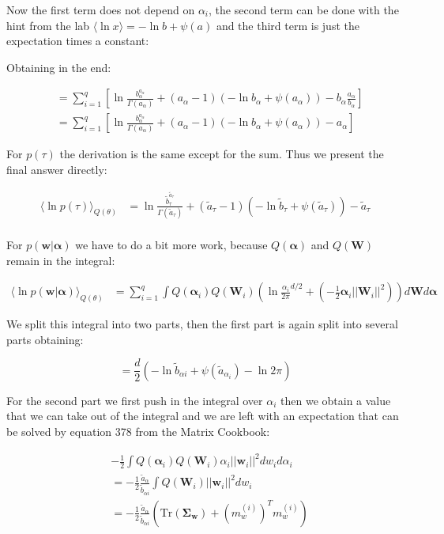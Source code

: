 \documentclass{article}
\def\*#1{\boldsymbol{#1}}
\begin{document}
Now the first term does not depend on $\alpha_i$, the second term can be done with the hint from the lab $\langle \ln x\rangle = - \ln b + \psi(a)$ and the third term is just the expectation times a constant:

Obtaining in the end:

\begin{align*}
&= \sum_{i=1}^q \left [ \ln \frac{b_\alpha^{a_\alpha}}{\Gamma(a_\alpha)} + (a_\alpha - 1)(- \ln b_\alpha + \psi(a_\alpha)) - b_\alpha \frac{a_\alpha}{b_\alpha} \right] \\
&= \sum_{i=1}^q \left [\ln \frac{b_\alpha^{a_\alpha}}{\Gamma(a_\alpha)} + (a_\alpha - 1)(- \ln b_\alpha + \psi(a_\alpha)) - a_\alpha \right ]
\end{align*}

For $p(\tau)$ the derivation is the same except for the sum. Thus we present the final answer directly:

\begin{align*}
\langle \ln p(\tau) \rangle_{Q(\theta)} &= \ln \frac{\tilde{b}_\tau^{\tilde{a}_\tau}}{\Gamma(\tilde{a}_\tau)} + (\tilde{a}_\tau - 1)(- \ln \tilde{b}_\tau + \psi(\tilde{a}_\tau)) - \tilde{a}_\tau \\
\end{align*}

For $p(\*w|\*\alpha)$ we have to do a bit more work, because $Q(\*\alpha)$ and $Q(\*W)$ remain in the integral:

\begin{align*}
\langle \ln p(\*w|\*\alpha) \rangle_{Q(\theta)} &= \sum_{i = 1}^q \int Q(\*\alpha_i)Q(\*W_i)(\ln \frac{\alpha_i}{2\pi}^{d/2} + (- \frac12 \*\alpha_i ||\*W_i||^2 )) d\*W d\*\alpha
\end{align*}

We split this integral into two parts, then the first part is again split into several parts obtaining:

$$= \frac{d}{2}( - \ln \tilde{b}_{\alpha i} + \psi(\tilde{a}_{\alpha_i}) - \ln 2\pi)$$

For the second part we first push in the integral over $\alpha_i$ then we obtain a value that we can take out of the integral and we are left with an expectation that can be solved by equation 378 from the Matrix Cookbook:

\begin{align*}
& - \frac12 \int Q(\*\alpha_i) Q(\*W_i) \alpha_i ||\*w_i||^2 dw_i d\alpha_i \\
&= - \frac12 \frac{\tilde{a}_\alpha}{\tilde{b}_{\alpha i}} \int Q(\*W_i) ||\*w_i||^2 dw_i \\
&= - \frac12 \frac{\tilde{a}_\alpha}{\tilde{b}_{\alpha i}} (\mbox{Tr}(\*{\Sigma_w}) + (m_w^{(i)})^T m_w^{(i)} )
\end{align*}
\end{document}
